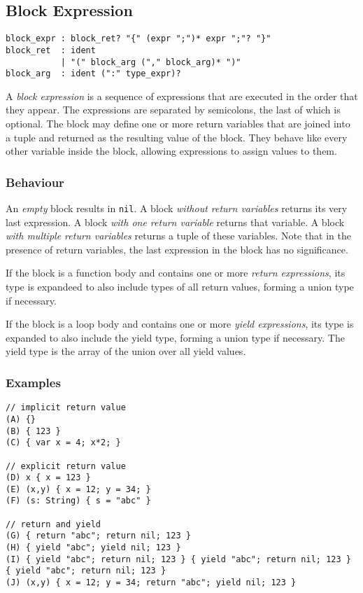 \subsection{Block Expression}

\begin{lstlisting}[language=EBNF]
block_expr : block_ret? "{" (expr ";")* expr ";"? "}"
block_ret  : ident
           | "(" block_arg ("," block_arg)* ")"
block_arg  : ident (":" type_expr)?
\end{lstlisting}

A \emph{block expression} is a sequence of expressions that are executed in the
order that they appear. The expressions are separated by semicolons, the last of
which is optional. The block may define one or more return variables that are
joined into a tuple and returned as the resulting value of the block. They
behave like every other variable inside the block, allowing expressions to
assign values to them.

\subsubsection{Behaviour}

An \emph{empty} block results in \lstinline{nil}. A block \emph{without return
variables} returns its very last expression. A block \emph{with one return
variable} returns that variable. A block \emph{with multiple return variables}
returns a tuple of these variables. Note that in the presence of return
variables, the last expression in the block has no significance.

If the block is a function body and contains one or more \emph{return
expressions}, its type is expandeed to also include types of all return values,
forming a union type if necessary.

If the block is a loop body and contains one or more \emph{yield expressions},
its type is expanded to also include the yield type, forming a union type if
necessary. The yield type is the array of the union over all yield values.

\subsubsection{Examples}

\begin{lstlisting}
// implicit return value
(A) {}
(B) { 123 }
(C) { var x = 4; x*2; }

// explicit return value
(D) x { x = 123 }
(E) (x,y) { x = 12; y = 34; }
(F) (s: String) { s = "abc" }

// return and yield
(G) { return "abc"; return nil; 123 }
(H) { yield "abc"; yield nil; 123 }
(I) { yield "abc"; return nil; 123 } { yield "abc"; return nil; 123 } { yield "abc"; return nil; 123 }
(J) (x,y) { x = 12; y = 34; return "abc"; yield nil; 123 }
\end{lstlisting}

